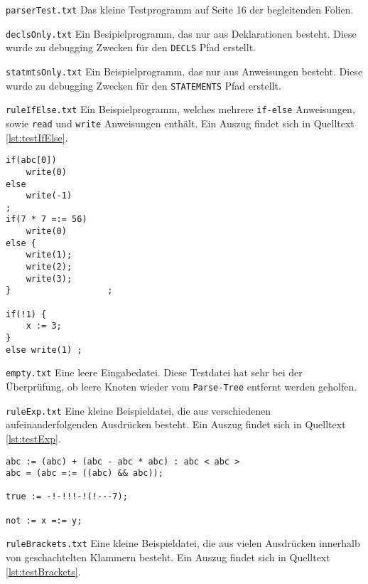 \documentclass[
a4paper,   %
11pt,      %
oneside,   %
onecolumn, %
final      %
]{article}
\newcommand{\code}[1]{\lstinline$#1$}
\begin{document}
\begin{description}
\item{\texttt{parserTest.txt}} Das kleine Testprogramm auf Seite 16 der begleitenden Folien.

\item{\texttt{declsOnly.txt}} Ein Besipielprogramm, das nur aus Deklarationen besteht. Diese wurde zu debugging Zwecken für den \code{DECLS} Pfad erstellt.

\item{\texttt{statmtsOnly.txt}} Ein Beispielprogramm, das nur aus Anweisungen besteht. Diese wurde zu debugging Zwecken für den \code{STATEMENTS} Pfad erstellt.

\item{\texttt{ruleIfElse.txt}} Ein Beispielprogramm, welches mehrere \code{if-else} Anweisungen, sowie \code{read} und \code{write} Anweisungen enthält. Ein Auszug findet sich in Quelltext \ref{lst:testIfElse}.

\begin{lstlisting}[language=SysProgLang, caption={ruleIfElse.txt}, label=lst:testIfElse]
if(abc[0])
    write(0)
else
    write(-1)
;
if(7 * 7 =:= 56)
    write(0)
else {
    write(1);
    write(2);
    write(3);
}                   ;

if(!1) {
    x := 3;
}
else write(1) ;
\end{lstlisting}

\item{\texttt{empty.txt}} Eine leere Eingabedatei. Diese Testdatei hat sehr bei der Überprüfung, ob leere Knoten wieder vom \code{Parse-Tree} entfernt werden geholfen.

\item{\texttt{ruleExp.txt}} Eine kleine Beispieldatei, die aus verschiedenen aufeinanderfolgenden Ausdrücken besteht. Ein Auszug findet sich in Quelltext \ref{lst:testExp}.

\begin{lstlisting}[language=SysProgLang, caption={ruleExp.txt}, label=lst:testExp]
abc := (abc) + (abc - abc * abc) : abc < abc > 
abc = (abc =:= ((abc) && abc));

true := -!-!!!-!(!---7);

not := x =:= y;
\end{lstlisting}

\item{\texttt{ruleBrackets.txt}} Eine kleine Beispieldatei, die aus vielen Ausdrücken innerhalb von geschachtelten Klammern besteht. Ein Auszug findet sich in Quelltext \ref{lst:testBrackets}.


\end{description}
\end{document}
